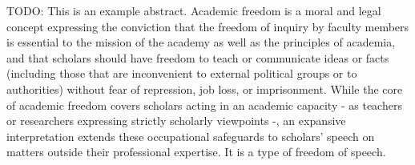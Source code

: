 TODO: This is an example abstract.
%
Academic freedom is a moral and legal concept expressing the conviction that
the freedom of inquiry by faculty members is essential to the mission of the
academy as well as the principles of academia, and that scholars should have
freedom to teach or communicate ideas or facts (including those that are
inconvenient to external political groups or to authorities) without fear of
repression, job loss, or imprisonment.
%
While the core of academic freedom covers scholars acting in an academic
capacity - as teachers or researchers expressing strictly scholarly viewpoints
-, an expansive interpretation extends these occupational safeguards to
scholars' speech on matters outside their professional expertise.
%
It is a type of freedom of speech.
